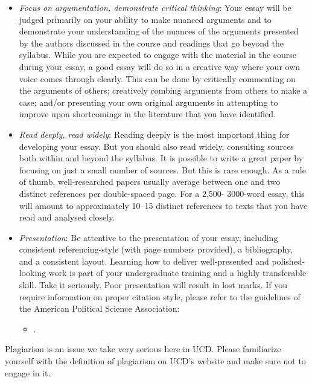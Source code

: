 \documentclass[abstract=on,parskip=full,headings=standardclasses,fontsize=11pt,paper=a4]{scrartcl}
\begin{document}
\begin{itemize}
\begin{itemize}
\item \textit{Focus on argumentation, demonstrate critical thinking}: Your essay will be judged primarily on your ability to make nuanced arguments and to demonstrate your understanding of the nuances of the arguments presented by the authors discussed in the course and readings that go beyond the syllabus. While you are expected to engage with the material in the course during your essay, a good essay will do so in a creative way where your own voice comes through clearly. This can be done by critically commenting on the arguments of others; creatively combing arguments from others to make a case; and/or presenting your own original arguments in attempting to improve upon shortcomings in the literature that you have identified.
\item \textit{Read deeply, read widely}: Reading deeply is the most important thing for developing your essay. But you should also read widely, consulting sources both within and beyond the syllabus. It is possible to write a great paper by focusing on just a small number of sources. But this is rare enough. As a rule of thumb, well-researched papers usually average between one and two distinct references per double-spaced page. For a 2,500- 3000-word essay, this will amount to approximately 10--15 distinct references to texts that you have read and analysed closely. 
\item \textit{Presentation}: Be attentive to the presentation of your essay, including consistent referencing-style (with page numbers provided), a bibliography, and  a consistent layout. Learning how to deliver well-presented and polished-looking work is part of your undergraduate training and a highly transferable skill. Take it seriously. Poor presentation will result in lost marks. If you require information on proper citation style, please refer to the guidelines of the American Political Science Association: 
\begin{itemize}
\item {}.
\end{itemize}
\end{itemize}
\end{itemize}



Plagiarism is an issue we take very serious here in UCD. Please familiarize yourself with the definition of plagiarism on UCD's website and make sure not to engage in it.
\end{document}
